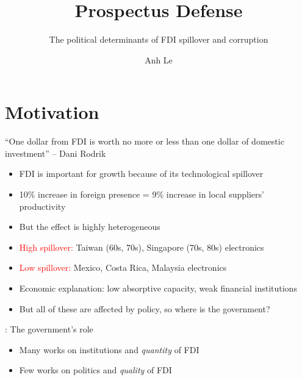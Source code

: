 \documentclass[14pt]{beamer}
\title{Prospectus Defense}
\subtitle{The political determinants of FDI spillover and corruption}
\author{Anh Le}
\begin{document}
\begin{frame}
\titlepage
\end{frame}

\section{Motivation}

\begin{frame}
``One dollar from FDI is worth no more or less than one dollar of domestic investment'' -- Dani Rodrik
\end{frame}

\begin{frame}{\secname}
\begin{itemize}
\item<1->{FDI is important for growth because of its technological spillover}

\item<2-> 10\% increase in foreign presence = 9\% increase in local suppliers' productivity \citep{Havranek2011}
\end{itemize}
\end{frame}

\begin{frame}{\secname}
\begin{itemize}
\item<1-> But the effect is highly heterogeneous
\item<2-> \textcolor{red}{High spillover:} Taiwan (60s, 70s), Singapore (70s, 80s) electronics
\item<3-> \textcolor{red}{Low spillover:} Mexico, Costa Rica, Malaysia electronics
\end{itemize}
\end{frame}

\begin{frame}{\secname}
\begin{itemize}
\item<1-> Economic explanation: low absorptive capacity, weak financial institutions
\item<2-> But all of these are affected by policy, so where is the government?
\end{itemize}
\end{frame}

\begin{frame}{\secname: The government's role}
\begin{itemize}
\item<1-> Many works on institutions and \textit{quantity} of FDI \citep{Jensen2003, Li2003, Ahlquist2006}
\item<2-> Few works on politics and \textit{quality} of FDI
\end{itemize}
\end{frame}
\end{document}
